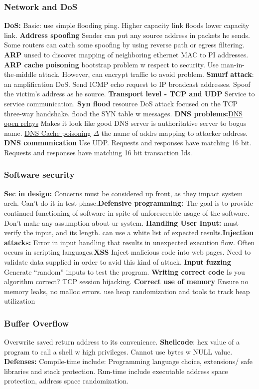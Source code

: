 \documentclass[a4paper,1pt]{article}
\begin{document}
\subsubsection{Network and DoS}
{\bf DoS:} Basic: use simple flooding ping. Higher capacity link floods lower capacity link. {\bf Address spoofing} Sender can put any source address in packets he sends. Some routers can catch some spoofing by using reverse path or egress filtering. {\bf ARP} unsed to discover mapping of neighboring ethernet MAC to PI addresses. {\bf ARP cache poisoning} bootstrap problem w respect to security. Use man-in-the-middle attack. However, can encrypt traffic to avoid problem. {\bf Smurf attack}: an amplification DoS. Send ICMP echo request to IP broadcast addresses. Spoof the victim's address as he source. {\bf Transport level - TCP and UDP} Service to service communication. {\bf Syn flood} resource DoS attack focused on the TCP three-way handshake. flood the SYN table w messages.
{\bf DNS problems:}\underline{DNS open relays} Makes it look like good DNS server is authoritative server to bogus name. \underline{DNS Cache poisoning} $\Delta$ the name of addrs mapping to attacker address. {\bf DNS communication} Use UDP. Requests and responses have matching 16 bit. Requests and responses have matching 16 bit transaction Ids.
\subsubsection{Software security}
{\bf Sec in design:} Concerns must be considered up front, as they impact system arch. Can't do it in test phase.{\bf Defensive programming:} The goal is to provide continued functioning of software in spite of unforeseeable usage of the software. Don't make any assumption about ur system. {\bf Handling User Input:} must verify the input, and its length. can use a white list of expected results.{\bf Injection attacks:} Error in input handling that results in unexpected execution flow.  Often occurs in scripting languages.{\bf XSS} Inject malicious code into web pages. Need to validate data supplied in order to avid this kind of attack. {\bf Input fuzzing} Generate ``random'' inputs to test the program. {\bf Writing correct code} Is you algorithm correct? TCP session hijacking. {\bf Correct use of memory} Ensure no memory leaks, no malloc errors. use heap randomization and tools to track heap utilization
\subsubsection{Buffer Overflow}
Overwrite saved return address to its convenience. {\bf Shellcode}: hex value of a program to call a shell w high privileges. Cannot use bytes w NULL value. {\bf Defenses:} Compile-time include: Programming language choice, extensions/ safe libraries and stack protection. Run-time include executable address space protection, address space randomization.
\end{document}
